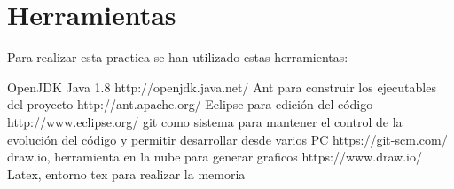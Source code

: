 \chapter{Herramientas}

Para realizar esta practica se han utilizado estas herramientas:

OpenJDK Java 1.8 http://openjdk.java.net/
Ant para construir los ejecutables del proyecto http://ant.apache.org/
Eclipse para edición del código http://www.eclipse.org/
git como sistema para mantener el control de la evolución del código y permitir desarrollar desde varios PC https://git-scm.com/
draw.io, herramienta en la nube para generar graficos https://www.draw.io/
Latex, entorno tex para realizar la memoria
